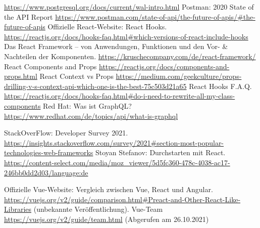 \begin{thebibliography}{HR08}
   \url{https://www.postgresql.org/docs/current/wal-intro.html}
  Postman: 2020 State of the API Report \url{https://www.postman.com/state-of-api/the-future-of-apis/#the-future-of-apis}
   Offizielle React-Website: React Hooks. \url{https://reactjs.org/docs/hooks-faq.html#which-versions-of-react-include-hooks}
   Das React Framework – von Anwendungen, Funktionen und den Vor- \& Nachteilen der Komponenten. \url{https://kruschecompany.com/de/react-framework/}
   React Components and Props \url{https://reactjs.org/docs/components-and-props.html}
   React Context vs Props \url{https://medium.com/geekculture/props-drilling-v-s-context-api-which-one-is-the-best-75c503d21a65}
   React Hooks F.A.Q. \url{https://reactjs.org/docs/hooks-faq.html#do-i-need-to-rewrite-all-my-class-components}
  Red Hat: Was ist GraphQL? \url{https://www.redhat.com/de/topics/api/what-is-graphql}

  StackOverFlow: Developer Survey 2021. \url{https://insights.stackoverflow.com/survey/2021#section-most-popular-technologies-web-frameworks}
  Stoyan Stefanov: Durchstarten mit React. \url{https://content-select.com/media/moz_viewer/5d5fc360-478c-4038-ac17-246bb0dd2d03/language:de}
 
   Offizielle Vue-Website: Vergleich zwischen Vue, React und Angular. \url{https://vuejs.org/v2/guide/comparison.html#Preact-and-Other-React-Like-Libraries} (unbekannte Veröffentlichung).
   Vue-Team \url{https://vuejs.org/v2/guide/team.html} (Abgerufen am 26.10.2021)
\end{thebibliography}